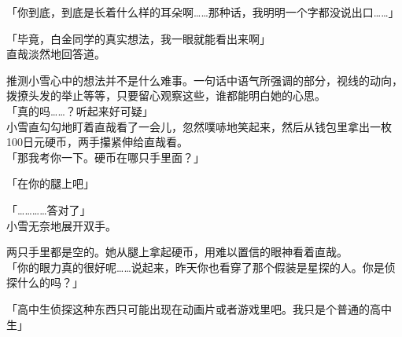 「你到底，到底是长着什么样的耳朵啊……那种话，我明明一个字都没说出口……」

「毕竟，白金同学的真实想法，我一眼就能看出来啊」\\

直哉淡然地回答道。

推测小雪心中的想法并不是什么难事。一句话中语气所强调的部分，视线的动向，拨撩头发的举止等等，只要留心观察这些，谁都能明白她的心思。\\

「真的吗……？听起来好可疑」\\

小雪直勾勾地盯着直哉看了一会儿，忽然噗哧地笑起来，然后从钱包里拿出一枚100日元硬币，两手攥紧伸给直哉看。\\

「那我考你一下。硬币在哪只手里面？」

「在你的腿上吧」

「…………答对了」\\

小雪无奈地展开双手。

两只手里都是空的。她从腿上拿起硬币，用难以置信的眼神看着直哉。\\

「你的眼力真的很好呢……说起来，昨天你也看穿了那个假装是星探的人。你是侦探什么的吗？」

「高中生侦探这种东西只可能出现在动画片或者游戏里吧。我只是个普通的高中生」


